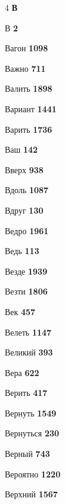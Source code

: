 \begin{multicols}{4}
\vspace{0.6em}\noindent\textbf{\normalsize\sffamily\color{primary} В}\par\vspace{0.2em}
\noindent В \dotfill \textbf{\color{secondary} 2}\par
\noindent Вагон \dotfill \textbf{\color{secondary} 1098}\par
\noindent Важно \dotfill \textbf{\color{secondary} 711}\par
\noindent Валить \dotfill \textbf{\color{secondary} 1898}\par
\noindent Вариант \dotfill \textbf{\color{secondary} 1441}\par
\noindent Варить \dotfill \textbf{\color{secondary} 1736}\par
\noindent Ваш \dotfill \textbf{\color{secondary} 142}\par
\noindent Вверх \dotfill \textbf{\color{secondary} 938}\par
\noindent Вдоль \dotfill \textbf{\color{secondary} 1087}\par
\noindent Вдруг \dotfill \textbf{\color{secondary} 130}\par
\noindent Ведро \dotfill \textbf{\color{secondary} 1961}\par
\noindent Ведь \dotfill \textbf{\color{secondary} 113}\par
\noindent Везде \dotfill \textbf{\color{secondary} 1939}\par
\noindent Везти \dotfill \textbf{\color{secondary} 1806}\par
\noindent Век \dotfill \textbf{\color{secondary} 457}\par
\noindent Велеть \dotfill \textbf{\color{secondary} 1147}\par
\noindent Великий \dotfill \textbf{\color{secondary} 393}\par
\noindent Вера \dotfill \textbf{\color{secondary} 622}\par
\noindent Верить \dotfill \textbf{\color{secondary} 417}\par
\noindent Вернуть \dotfill \textbf{\color{secondary} 1549}\par
\noindent Вернуться \dotfill \textbf{\color{secondary} 230}\par
\noindent Верный \dotfill \textbf{\color{secondary} 743}\par
\noindent Вероятно \dotfill \textbf{\color{secondary} 1220}\par
\noindent Верхний \dotfill \textbf{\color{secondary} 1567}\par

\end{multicols}
